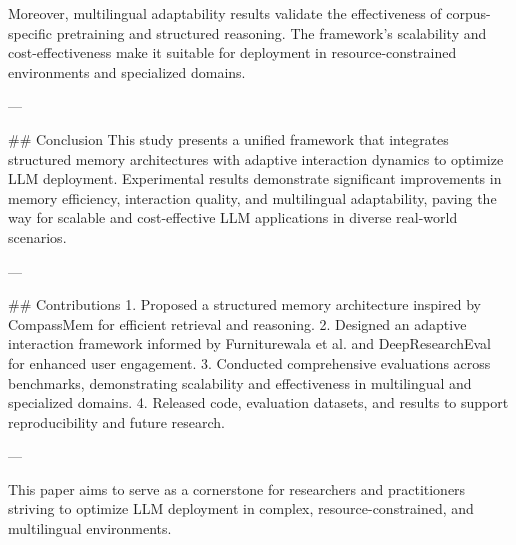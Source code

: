 Moreover, multilingual adaptability results validate the effectiveness of corpus-specific pretraining and structured reasoning. The framework's scalability and cost-effectiveness make it suitable for deployment in resource-constrained environments and specialized domains.

---

## Conclusion
This study presents a unified framework that integrates structured memory architectures with adaptive interaction dynamics to optimize LLM deployment. Experimental results demonstrate significant improvements in memory efficiency, interaction quality, and multilingual adaptability, paving the way for scalable and cost-effective LLM applications in diverse real-world scenarios.

---

## Contributions
1. Proposed a structured memory architecture inspired by CompassMem for efficient retrieval and reasoning.
2. Designed an adaptive interaction framework informed by Furniturewala et al. and DeepResearchEval for enhanced user engagement.
3. Conducted comprehensive evaluations across benchmarks, demonstrating scalability and effectiveness in multilingual and specialized domains.
4. Released code, evaluation datasets, and results to support reproducibility and future research.

---

This paper aims to serve as a cornerstone for researchers and practitioners striving to optimize LLM deployment in complex, resource-constrained, and multilingual environments.